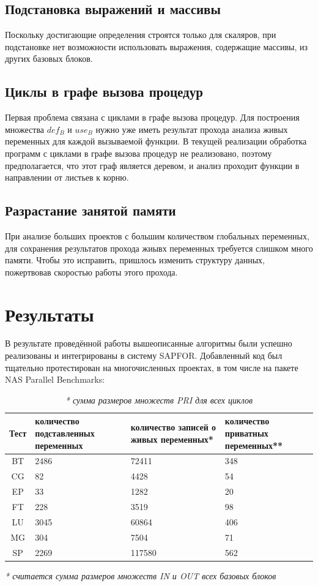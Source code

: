 \documentclass{article}
\begin{document}
\subsection*{Подстановка выражений и массивы}
    Поскольку достигающие определения строятся только для скаляров, при подстановке нет возможности использовать выражения, содержащие массивы, из других базовых блоков.

\subsection*{Циклы в графе вызова процедур}
    Первая проблема связана с циклами в графе вызова процедур. Для построения множества $def_B$ и $use_B$ нужно уже иметь результат прохода анализа живых переменных для каждой вызываемой функции. В текущей реализации обработка программ с циклами в графе вызова процедур не реализовано, 
    поэтому предполагается, что этот граф является деревом, и анализ проходит функции в направлении от листьев к корню.

\subsection*{Разрастание занятой памяти}
    При анализе больших проектов с большим количеством глобальных переменных, для сохранения результатов прохода жиывх переменных требуется слишком много памяти. Чтобы это исправить, пришлось изменить структуру данных, пожертвовав скоростью работы этого прохода.

\section{Результаты}
    В результате проведённой работы вышеописанные алгоритмы были успешно реализованы и интегрированы в систему SAPFOR.
    Добавленный код был тщательно протестирован на многочисленных проектах, в том числе на пакете NAS Parallel Benchmarks\cite{npb}:
\\

\begin{table}[h!]
    \centering
\begin{tabular}{ | c || p{2.5cm} | p{3.5cm} | p{2.5cm} |  }
 \hline
 Тест& количество подставленных переменных & количество записей о живых переменных* &количество приватных переменных**\\
 \hline
 BT & 2486 & 72411 & 348 \\
 \hline
CG & 82 & 4428 & 54 \\
\hline
EP & 33 & 1282 & 20 \\
\hline
FT & 228 & 3519 & 98 \\
\hline
LU & 3045 & 60864 & 406 \\
\hline
MG & 304 & 7504 & 71 \\
\hline
SP & 2269 & 117580 & 562 \\
 \hline
\end{tabular}
\caption*{\textit{* считается сумма размеров множеств IN и OUT всех базовых блоков }}
\caption*{\textit{* сумма размеров множеств PRI для всех циклов }}
\end{table}
\end{document}

